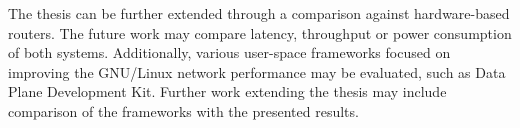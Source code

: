 The thesis can be further extended through a comparison against hardware-based routers.
The future work may compare latency, throughput or power consumption of both systems.
Additionally, various user-space frameworks focused on improving the GNU/Linux network performance may be evaluated,
such as Data Plane Development Kit.
Further work extending the thesis may include comparison of
the frameworks with the presented results.
